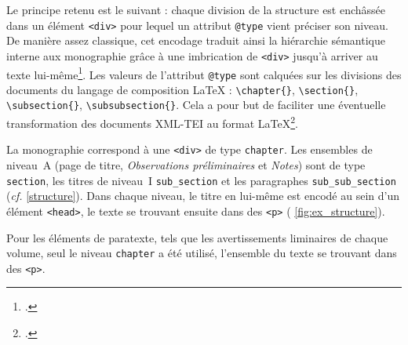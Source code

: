 Le principe retenu est le suivant : chaque division de la structure est enchâssée dans un élément \texttt{<div>} pour lequel un attribut \texttt{@type} vient préciser son niveau. De manière assez classique, cet encodage traduit ainsi la hiérarchie sémantique interne aux monographie grâce à une imbrication de \texttt{<div>} jusqu'à arriver au texte lui-même\footcite[p. 117]{clerice}. Les valeurs de l'attribut \texttt{@type} sont calquées sur les divisions des documents du langage de composition \LaTeX{} : \texttt{\textbackslash chapter\{\}}, \texttt{\textbackslash section\{\}}, \texttt{\textbackslash subsection\{\}}, \texttt{\textbackslash subsubsection\{\}}. Cela a pour but de faciliter une éventuelle transformation des documents XML-TEI au format \LaTeX\footcite[p. 52]{chague2}.

La monographie correspond à une \texttt{<div>} de type \texttt{chapter}. Les ensembles de niveau~A (page de titre, \textit{Observations préliminaires} et \textit{Notes}) sont de type \texttt{section}, les titres de niveau~I \texttt{sub\_section} et les paragraphes \texttt{sub\_sub\_section} (\textit{cf.} \ann{} \ref{structure}). Dans chaque niveau, le titre en lui-même est encodé au sein d'un élément \texttt{<head>}, le texte se trouvant ensuite dans des \texttt{<p>} (\fig{} \ref{fig:ex_structure}).

Pour les éléments de paratexte, tels que les avertissements liminaires de chaque volume, seul le niveau \texttt{chapter} a été utilisé, l'ensemble du texte se trouvant dans des \texttt{<p>}.

